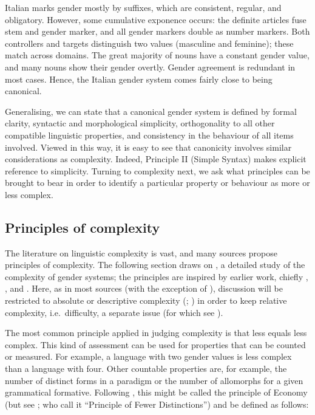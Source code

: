 \documentclass[output=collectionpaper]{langsci/langscibook}
\begin{document}
Italian marks gender mostly by suffixes, which are consistent, regular, and obligatory. However, some cumulative exponence occurs: the definite articles fuse stem and gender marker, and all gender markers double as number markers. Both controllers and targets distinguish two values (masculine and feminine); these match across domains. The great majority of nouns have a constant gender value, and many nouns show their gender overtly. Gender agreement is redundant in most cases. Hence, the Italian gender system comes fairly close to being canonical.

Generalising, we can state that a canonical gender system is defined by formal clarity, syntactic and morphological simplicity, orthogonality to all other compatible linguistic properties, and consistency in the behaviour of all items involved. Viewed in this way, it is easy to see that canonicity involves similar considerations as complexity. Indeed, Principle II (Simple Syntax) makes explicit reference to simplicity. Turning to complexity next, we ask what principles can be brought to bear in order to identify a particular property or behaviour as more or less complex.

\subsection{Principles of complexity}
\label{sec:Audr:2.3}

The literature on linguistic complexity is vast, and many sources propose principles of complexity. The following section draws on \citet{Audring2017}, a detailed study of the complexity of gender systems; the principles are inspired by earlier work, chiefly \citet{Kusters2003}, \citet{Miestamo2008}, and \citet{DiGarbo2014,DiGarbo2016}. Here, as in most sources (with the exception of \citealt{Kusters2003}), discussion will be restricted to absolute or descriptive complexity (\citealt{Miestamo2008}; \citealt{Sinnemaeki2011,Sinnemaeki2014}) in order to keep relative complexity, i.e.\ difficulty, a separate issue (for which see ‎).

The most common principle applied in judging complexity is that less equals less complex. This kind of assessment can be used for properties that can be counted or measured. For example, a language with two gender values is less complex than a language with four. Other countable properties are, for example, the number of distinct forms in a paradigm or the number of allomorphs for a given grammatical formative. Following \citet{Kusters2003}, this might be called the principle of Economy (but see \citealt{Miestamo2008};  who call it ``Principle of Fewer Distinctions'') and be defined as follows:
\end{document}
